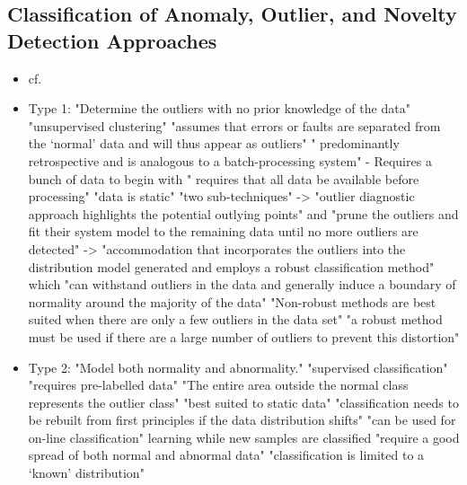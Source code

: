 	\subsection{Classification of Anomaly, Outlier, and Novelty Detection Approaches}
	\begin{itemize}
		\item cf. \textcite{Hodge2004}
		\item Type 1: "Determine the outliers with no prior knowledge of the data" \parencite{Hodge2004}
		\subitem "unsupervised clustering" \parencite{Hodge2004}
		\subitem "assumes that errors or faults are separated from the ‘normal’ data and will thus appear as outliers" \parencite{Hodge2004}
		\subitem " predominantly retrospective and is analogous to a batch-processing system" \parencite{Hodge2004} - Requires a bunch of data to begin with
		\subitem " requires that all data be available before processing" \parencite{Hodge2004}
		\subitem "data is static" \parencite{Hodge2004}
		\subitem "two sub-techniques" \parencite{Hodge2004}
		\subitem -> "outlier diagnostic approach highlights the potential outlying points" \parencite{Hodge2004} and "prune the outliers and fit their system model to the remaining data until no more outliers are detected" \parencite{Hodge2004}
		\subitem -> "accommodation that incorporates the outliers into the distribution model generated and employs a robust classification method" \parencite{Hodge2004} which "can withstand outliers in the data and generally induce a boundary of normality around the majority of the data" \parencite{Hodge2004}
		\subitem "Non-robust methods are best suited when there are only a few outliers in the data set" \parencite{Hodge2004}
		\subitem "a robust method must be used if there are a large number of outliers to prevent this distortion" \parencite{Hodge2004}
		\item Type 2: "Model both normality and abnormality." \parencite{Hodge2004}
		\subitem "supervised classification" \parencite{Hodge2004}
		\subitem "requires pre-labelled data" \parencite{Hodge2004}
		\subitem "The entire area outside the normal class represents the outlier class" \parencite{Hodge2004}
		\subitem "best suited to static data" \parencite{Hodge2004} "classification needs to be rebuilt from first principles if the data distribution shifts" \parencite{Hodge2004}
		\subitem "can be used for on-line classification" \parencite{Hodge2004} learning while new samples are classified
		\subitem "require a good spread of both normal and abnormal data" \parencite{Hodge2004}
		\subitem "classification is limited to a ‘known’ distribution" \parencite{Hodge2004}

\end{itemize}
